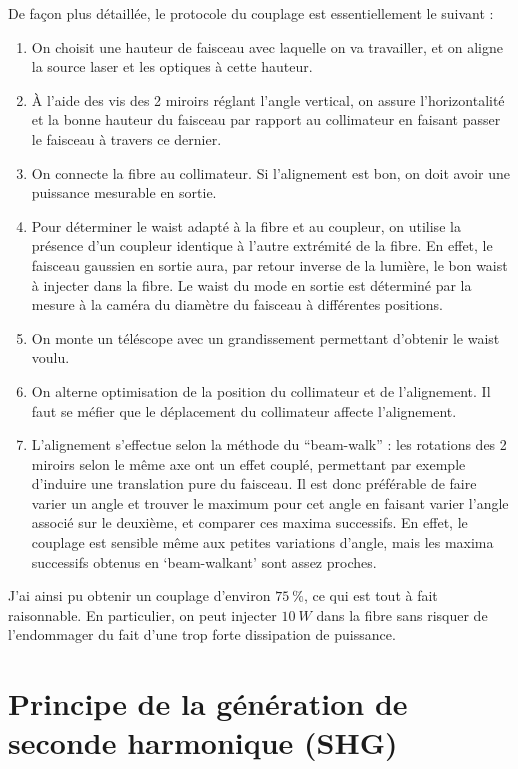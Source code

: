 \documentclass[11pt,a4paper]{article}
\begin{document}
De façon plus détaillée, le protocole du couplage est essentiellement le suivant :
\begin{enumerate}
	\item On choisit une hauteur de faisceau avec laquelle on va travailler, et on aligne la source laser et les optiques à cette hauteur.
	\item À l'aide des vis des 2 miroirs réglant l'angle vertical, on assure l'horizontalité et la bonne hauteur du faisceau par rapport au collimateur en faisant passer le faisceau à travers ce dernier.
	\item On connecte la fibre au collimateur. Si l'alignement est bon, on doit avoir une puissance mesurable en sortie.
	\item Pour déterminer le waist adapté à la fibre et au coupleur, on utilise la présence d'un coupleur identique à l'autre extrémité de la fibre. En effet, le faisceau gaussien en sortie aura, par retour inverse de la lumière, le bon waist à injecter dans la fibre. Le waist du mode en sortie est déterminé par la mesure à la caméra du diamètre du faisceau à différentes positions.	
	\item On monte un téléscope avec un grandissement permettant d'obtenir le waist voulu.
	\item On alterne optimisation de la position du collimateur et de l'alignement. Il faut se méfier que le déplacement du collimateur affecte l'alignement.
	\item L'alignement s'effectue selon la méthode du ``beam-walk'' : les rotations des 2 miroirs selon le même axe ont un effet couplé, permettant par exemple d'induire une translation pure du faisceau. Il est donc préférable de faire varier un angle et trouver le maximum pour cet angle en faisant varier l'angle associé sur le deuxième, et comparer ces maxima successifs. En effet, le couplage est sensible même aux petites variations d'angle, mais les maxima successifs obtenus en `beam-walkant' sont assez proches. 
\end{enumerate}

J'ai ainsi pu obtenir un couplage d'environ $\SI{75}{\percent}$, ce qui est tout à fait raisonnable. En particulier, on peut injecter $\SI{10}{W}$ dans la fibre sans risquer de l'endommager du fait d'une trop forte dissipation de puissance.



\section{Principe de la génération de seconde harmonique (SHG)} %
\label{SHG}
\end{document}
